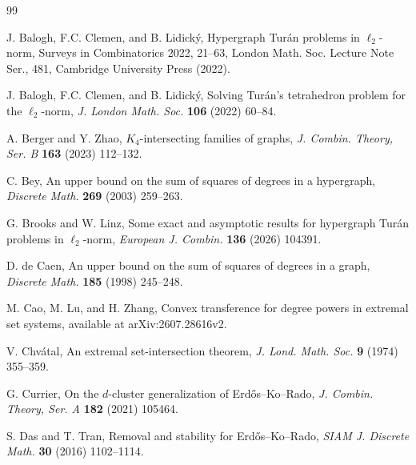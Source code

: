 \documentclass[11pt]{article}
\numberwithin{equation}{section}
\begin{document}
\begin{thebibliography}{99}



 J. Balogh, F.C. Clemen, and B. Lidick\'y,
Hypergraph Tur\'an problems in $\ell_2$-norm,
Surveys in Combinatorics 2022, 21--63,
London Math. Soc. Lecture Note Ser., 481, Cambridge University Press (2022).

 J. Balogh, F.C. Clemen, and B. Lidick\'y,
Solving Tur\'an's tetrahedron problem for the $\ell_2$-norm,
{\em J. London Math. Soc.} {\bf 106} (2022) 60--84.




 A. Berger and Y. Zhao,
$K_4$-intersecting families of graphs,
{\em J. Combin. Theory, Ser. B}  {\bf 163} (2023) 112--132.

 C. Bey,
An upper bound on the sum of squares of degrees in a hypergraph,
{\em Discrete Math.} {\bf 269} (2003) 259--263.


 G. Brooks and W. Linz,
Some exact and asymptotic results for hypergraph Tur\'an problems in $\ell_2$-norm,
{\em European J. Combin.} {\bf 136} (2026) 104391.


 D. de Caen,
An upper bound on the sum of squares of degrees in a graph,
{\em Discrete Math.} {\bf 185} (1998) 245--248.



 M. Cao, M. Lu, and H. Zhang,
Convex transference for degree powers in extremal set systems,
available at arXiv:2607.28616v2.

 V. Chv\'atal,
An extremal set-intersection theorem,
{\em J. Lond. Math. Soc.} {\bf 9} (1974) 355--359.


 G. Currier,
On the $d$-cluster generalization of Erd\H{o}s--Ko--Rado,
{\em J. Combin. Theory, Ser. A} {\bf 182} (2021) 105464.


 S. Das and T. Tran,
Removal and stability for Erd\H{o}s--Ko--Rado,
{\em SIAM J. Discrete Math.} {\bf 30} (2016) 1102--1114.



\end{thebibliography}
\end{document}
